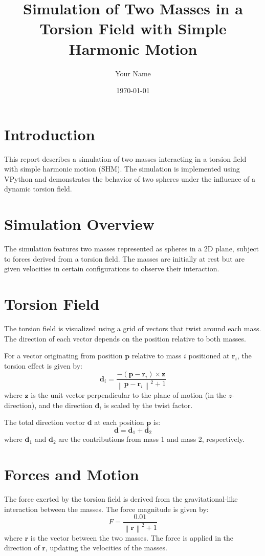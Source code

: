 \documentclass{article}
\title{Simulation of Two Masses in a Torsion Field with Simple Harmonic Motion}
\author{Your Name}
\date{\today}
\begin{document}
\maketitle

\section{Introduction}
This report describes a simulation of two masses interacting in a torsion field with simple harmonic motion (SHM). The simulation is implemented using VPython and demonstrates the behavior of two spheres under the influence of a dynamic torsion field.

\section{Simulation Overview}
The simulation features two masses represented as spheres in a 2D plane, subject to forces derived from a torsion field. The masses are initially at rest but are given velocities in certain configurations to observe their interaction.

\section{Torsion Field}
The torsion field is visualized using a grid of vectors that twist around each mass. The direction of each vector depends on the position relative to both masses. 

For a vector originating from position $\mathbf{p}$ relative to mass $i$ positioned at $\mathbf{r}_i$, the torsion effect is given by:
\[
\mathbf{d}_i = \frac{- (\mathbf{p} - \mathbf{r}_i) \times \mathbf{z}}{\left\| \mathbf{p} - \mathbf{r}_i \right\|^2 + 1}
\]
where $\mathbf{z}$ is the unit vector perpendicular to the plane of motion (in the $z$-direction), and the direction $\mathbf{d}_i$ is scaled by the twist factor.

The total direction vector $\mathbf{d}$ at each position $\mathbf{p}$ is:
\[
\mathbf{d} = \mathbf{d}_1 + \mathbf{d}_2
\]
where $\mathbf{d}_1$ and $\mathbf{d}_2$ are the contributions from mass 1 and mass 2, respectively.

\section{Forces and Motion}
The force exerted by the torsion field is derived from the gravitational-like interaction between the masses. The force magnitude is given by:
\[
F = \frac{0.01}{\left\| \mathbf{r} \right\|^2 + 1}
\]
where $\mathbf{r}$ is the vector between the two masses. The force is applied in the direction of $\mathbf{r}$, updating the velocities of the masses.
\end{document}

